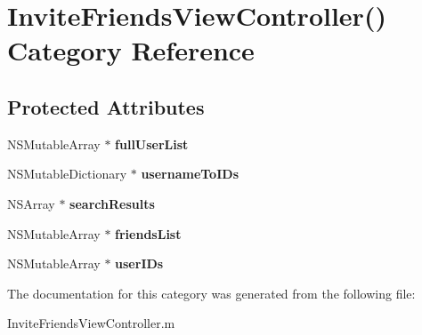 \hypertarget{category_invite_friends_view_controller_07_08}{\section{Invite\+Friends\+View\+Controller() Category Reference}
\label{category_invite_friends_view_controller_07_08}
}
\subsection*{Protected Attributes}
\begin{DoxyCompactItemize}
\item 
\hypertarget{category_invite_friends_view_controller_07_08_ab517f67f038761f88efedcb77fc6c869}{N\+S\+Mutable\+Array $\ast$ {\bfseries full\+User\+List}}\label{category_invite_friends_view_controller_07_08_ab517f67f038761f88efedcb77fc6c869}

\item 
\hypertarget{category_invite_friends_view_controller_07_08_adcc9ea2c4f85e2ca52153a1926de1d90}{N\+S\+Mutable\+Dictionary $\ast$ {\bfseries username\+To\+I\+Ds}}\label{category_invite_friends_view_controller_07_08_adcc9ea2c4f85e2ca52153a1926de1d90}

\item 
\hypertarget{category_invite_friends_view_controller_07_08_a509cf9159a0b6ac8d363b8edd7931031}{N\+S\+Array $\ast$ {\bfseries search\+Results}}\label{category_invite_friends_view_controller_07_08_a509cf9159a0b6ac8d363b8edd7931031}

\item 
\hypertarget{category_invite_friends_view_controller_07_08_a9fd1d856e98479070ed1b447e856bed4}{N\+S\+Mutable\+Array $\ast$ {\bfseries friends\+List}}\label{category_invite_friends_view_controller_07_08_a9fd1d856e98479070ed1b447e856bed4}

\item 
\hypertarget{category_invite_friends_view_controller_07_08_a514c105f14afb71acf1ac3fa5d059a79}{N\+S\+Mutable\+Array $\ast$ {\bfseries user\+I\+Ds}}\label{category_invite_friends_view_controller_07_08_a514c105f14afb71acf1ac3fa5d059a79}

\end{DoxyCompactItemize}


The documentation for this category was generated from the following file\+:\begin{DoxyCompactItemize}
\item 
Invite\+Friends\+View\+Controller.\+m\end{DoxyCompactItemize}
